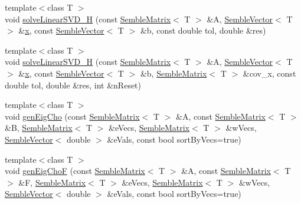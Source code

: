 \begin{DoxyCompactItemize}
\item 
{\footnotesize template$<$class T $>$ }\\void \mbox{\hyperlink{namespaceSEMBLE_a13a03156f292e8edb0d4d9e26a3c8de2}{solve\+Linear\+S\+V\+D\+\_\+H}} (const \mbox{\hyperlink{structSEMBLE_1_1SembleMatrix}{Semble\+Matrix}}$<$ T $>$ \&A, \mbox{\hyperlink{structSEMBLE_1_1SembleVector}{Semble\+Vector}}$<$ T $>$ \&\mbox{\hyperlink{old__edb_8cc_a63584b830e7aaacb521b11b72291a4bc}{x}}, const \mbox{\hyperlink{structSEMBLE_1_1SembleVector}{Semble\+Vector}}$<$ T $>$ \&b, const double tol, double \&res)
\item 
{\footnotesize template$<$class T $>$ }\\void \mbox{\hyperlink{namespaceSEMBLE_a263ad714a1484ebb46be58d5ace2c796}{solve\+Linear\+S\+V\+D\+\_\+H}} (const \mbox{\hyperlink{structSEMBLE_1_1SembleMatrix}{Semble\+Matrix}}$<$ T $>$ \&A, \mbox{\hyperlink{structSEMBLE_1_1SembleVector}{Semble\+Vector}}$<$ T $>$ \&\mbox{\hyperlink{old__edb_8cc_a63584b830e7aaacb521b11b72291a4bc}{x}}, const \mbox{\hyperlink{structSEMBLE_1_1SembleVector}{Semble\+Vector}}$<$ T $>$ \&b, \mbox{\hyperlink{structSEMBLE_1_1SembleMatrix}{Semble\+Matrix}}$<$ T $>$ \&cov\+\_\+x, const double tol, double \&res, int \&n\+Reset)
\item 
{\footnotesize template$<$class T $>$ }\\void \mbox{\hyperlink{namespaceSEMBLE_aba06a63f86012e882f63b598d22868af}{gen\+Eig\+Cho}} (const \mbox{\hyperlink{structSEMBLE_1_1SembleMatrix}{Semble\+Matrix}}$<$ T $>$ \&A, const \mbox{\hyperlink{structSEMBLE_1_1SembleMatrix}{Semble\+Matrix}}$<$ T $>$ \&B, \mbox{\hyperlink{structSEMBLE_1_1SembleMatrix}{Semble\+Matrix}}$<$ T $>$ \&e\+Vecs, \mbox{\hyperlink{structSEMBLE_1_1SembleMatrix}{Semble\+Matrix}}$<$ T $>$ \&w\+Vecs, \mbox{\hyperlink{structSEMBLE_1_1SembleVector}{Semble\+Vector}}$<$ double $>$ \&e\+Vals, const bool sort\+By\+Vecs=true)
\item 
{\footnotesize template$<$class T $>$ }\\void \mbox{\hyperlink{namespaceSEMBLE_a1b40b7a94a31839494c7e3c119384dfc}{gen\+Eig\+ChoF}} (const \mbox{\hyperlink{structSEMBLE_1_1SembleMatrix}{Semble\+Matrix}}$<$ T $>$ \&A, const \mbox{\hyperlink{structSEMBLE_1_1SembleMatrix}{Semble\+Matrix}}$<$ T $>$ \&F, \mbox{\hyperlink{structSEMBLE_1_1SembleMatrix}{Semble\+Matrix}}$<$ T $>$ \&e\+Vecs, \mbox{\hyperlink{structSEMBLE_1_1SembleMatrix}{Semble\+Matrix}}$<$ T $>$ \&w\+Vecs, \mbox{\hyperlink{structSEMBLE_1_1SembleVector}{Semble\+Vector}}$<$ double $>$ \&e\+Vals, const bool sort\+By\+Vecs=true)

\end{DoxyCompactItemize}
